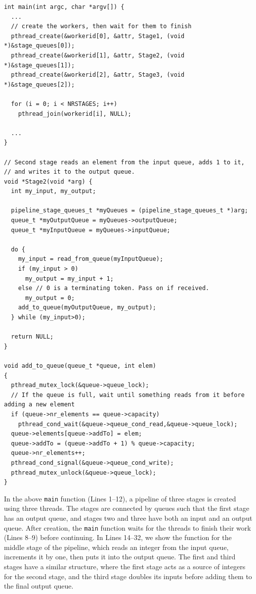 \begin{lstlisting}[caption=Original Simple Pipeline Code,frame=single,label=lst:simplePipe]
int main(int argc, char *argv[]) {
  ...  
  // create the workers, then wait for them to finish
  pthread_create(&workerid[0], &attr, Stage1, (void *)&stage_queues[0]);
  pthread_create(&workerid[1], &attr, Stage2, (void *)&stage_queues[1]);
  pthread_create(&workerid[2], &attr, Stage3, (void *)&stage_queues[2]);
  
  for (i = 0; i < NRSTAGES; i++)
    pthread_join(workerid[i], NULL);
  
  ...
}

// Second stage reads an element from the input queue, adds 1 to it,
// and writes it to the output queue.
void *Stage2(void *arg) {
  int my_input, my_output;
  
  pipeline_stage_queues_t *myQueues = (pipeline_stage_queues_t *)arg;
  queue_t *myOutputQueue = myQueues->outputQueue;
  queue_t *myInputQueue = myQueues->inputQueue;
  
  do {
    my_input = read_from_queue(myInputQueue);
    if (my_input > 0)
      my_output = my_input + 1;
    else // 0 is a terminating token. Pass on if received.
      my_output = 0;
    add_to_queue(myOutputQueue, my_output);
  } while (my_input>0);
  
  return NULL;
}

void add_to_queue(queue_t *queue, int elem)
{
  pthread_mutex_lock(&queue->queue_lock);
  // If the queue is full, wait until something reads from it before adding a new element
  if (queue->nr_elements == queue->capacity)
    pthread_cond_wait(&queue->queue_cond_read,&queue->queue_lock);
  queue->elements[queue->addTo] = elem;
  queue->addTo = (queue->addTo + 1) % queue->capacity;
  queue->nr_elements++;
  pthread_cond_signal(&queue->queue_cond_write);
  pthread_mutex_unlock(&queue->queue_lock);
}
\end{lstlisting}

\noindent
In the above \lstinline|main| function (Lines 1--12), a pipeline of three stages is created using three threads. The stages are connected by queues such that the first stage has an output queue, and stages two and three have both an input and an output queue. After creation, the \lstinline|main| function waits for the threads to finish their work (Lines 8--9) before continuing. In Lines 14--32, we show the function for the middle stage of the pipeline, which reads an integer from the input queue, increments it by one, then puts it into the output queue. The first and third stages have a similar structure, where the first stage acts as a source of integers for the second stage, and the third stage doubles its inputs before adding them to the final output queue.

